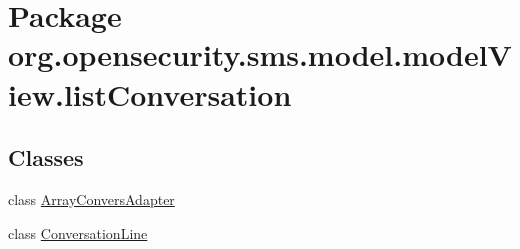 \hypertarget{a00039}{\section{Package org.\+opensecurity.\+sms.\+model.\+model\+View.\+list\+Conversation}
\label{a00039}
}
\subsection*{Classes}
\begin{DoxyCompactItemize}
\item 
class \hyperlink{a00003}{Array\+Convers\+Adapter}
\item 
class \hyperlink{a00008}{Conversation\+Line}
\end{DoxyCompactItemize}
